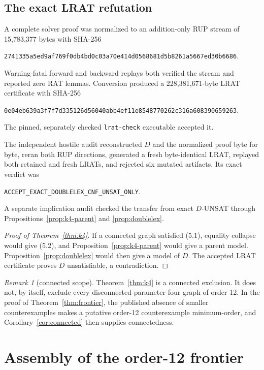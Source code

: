 \documentclass[11pt]{article}
\theoremstyle{definition}
\theoremstyle{remark}
\newtheorem{remark}[theorem]{Remark}
\newcommand{\filehash}[1]{\nolinkurl{#1}}
\begin{document}
\subsection{The exact LRAT refutation}

A complete solver proof was normalized to an addition-only RUP stream of
15,783,377 bytes with SHA-256
\begin{center}
\filehash{2741335a5ed9af769f0db4bd0c03a70e414d0568681d5b8261a5667ed30b6686}.
\end{center}
Warning-fatal forward and backward replays both verified the stream and
reported zero RAT lemmas.  Conversion produced a 228,381,671-byte LRAT
certificate with SHA-256
\begin{center}
\filehash{0e04eb639a3f7f7d335126d56040abb4ef11e8548770262c316a608390659263}.
\end{center}
The pinned, separately checked \texttt{lrat-check} executable accepted it.

The independent hostile audit reconstructed \(D\) and the normalized proof
byte for byte, reran both RUP directions, generated a fresh byte-identical
LRAT, replayed both retained and fresh LRATs, and rejected six mutated
artifacts.  Its exact verdict was
\begin{center}
\nolinkurl{ACCEPT_EXACT_DOUBLELEX_CNF_UNSAT_ONLY}.
\end{center}
A separate implication audit checked the transfer from exact \(D\)-UNSAT through
Propositions~\ref{prop:k4-parent} and \ref{prop:doublelex}.

\begin{proof}[Proof of Theorem~\ref{thm:k4}]
If a connected graph satisfied (5.1), equality collapse would give (5.2),
and Proposition~\ref{prop:k4-parent} would give a parent model.
Proposition~\ref{prop:doublelex} would then give a model of \(D\).
The accepted LRAT certificate proves \(D\) unsatisfiable, a contradiction.
\end{proof}

\begin{remark}[connected scope]\label{rem:k4-connected}
Theorem~\ref{thm:k4} is a connected exclusion.  It does not, by itself,
exclude every disconnected parameter-four graph of order 12.  In the
proof of Theorem~\ref{thm:frontier}, the published absence of smaller
counterexamples makes a putative order-12 counterexample minimum-order, and
Corollary~\ref{cor:connected} then supplies connectedness.
\end{remark}

\section{Assembly of the order-12 frontier}\label{sec:assemble}
\end{document}
